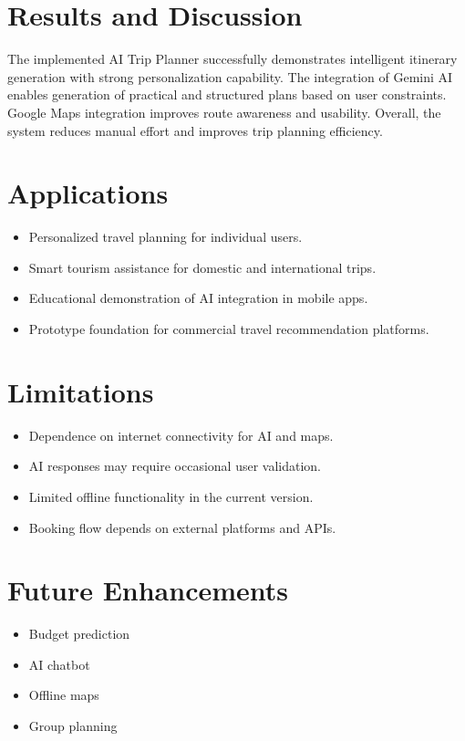 \documentclass[12pt,a4paper]{article}
\begin{document}
\clearpage
\section{Results and Discussion}
The implemented AI Trip Planner successfully demonstrates intelligent itinerary generation with strong personalization capability. The integration of Gemini AI enables generation of practical and structured plans based on user constraints. Google Maps integration improves route awareness and usability. Overall, the system reduces manual effort and improves trip planning efficiency.

\section{Applications}
\begin{itemize}
    \item Personalized travel planning for individual users.
    \item Smart tourism assistance for domestic and international trips.
    \item Educational demonstration of AI integration in mobile apps.
    \item Prototype foundation for commercial travel recommendation platforms.
\end{itemize}

\section{Limitations}
\begin{itemize}
    \item Dependence on internet connectivity for AI and maps.
    \item AI responses may require occasional user validation.
    \item Limited offline functionality in the current version.
    \item Booking flow depends on external platforms and APIs.
\end{itemize}

\section{Future Enhancements}
\begin{itemize}
    \item Budget prediction
    \item AI chatbot
    \item Offline maps
    \item Group planning
\end{itemize}
\end{document}

